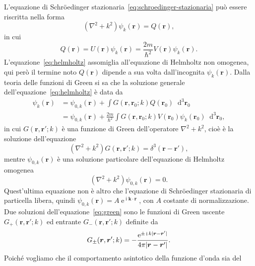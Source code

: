\documentclass[a4paper,fleqn,twoside,12pt]{article}
\newcommand*{\dd}{\mathop{}\!\mathrm{d}} %
\DeclareMathOperator{\e}{\mathrm{e}} %
\DeclareMathOperator{\uimm}{\mathrm{i}} %
\DeclarePairedDelimiter{\abs}{\lvert}{\rvert}
\begin{document}
L'equazione di Schröedinger stazionaria~\eqref{eq:schroedinger-stazionaria} può
essere riscritta nella forma
\begin{equation}
  \label{eq:helmholtz}
  (\nabla^{2} + k^{2})\psi_{k}(\bm{r}) = Q(\bm{r}),
\end{equation}
in cui
\begin{equation}
  Q(\bm{r}) = U(\bm{r})\psi_{k}(\bm{r}) =
  \frac{2m}{\hslash^{2}}V(\bm{r})\psi_{k}(\bm{r}).
\end{equation}
L'equazione~\eqref{eq:helmholtz} assomiglia all'equazione di Helmholtz non
omogenea, qui però il termine noto $Q(\bm{r})$ dipende a sua volta
dall'incognita $\psi_{k}(\bm{r})$.
Dalla teoria delle funzioni di Green si sa che la soluzione generale
dell'equazione~\eqref{eq:helmholtz} è data da
\begin{equation}
  \begin{split}
    \psi_{k}(\bm{r}) &= \psi_{0,k}(\bm{r}) + \int
    G(\bm{r},\bm{r}_{0};k)Q(\bm{r}_{0})\dd^{3}\bm{r}_{0} \\
    &= \psi_{0,k}(\bm{r}) + \frac{2m}{\hslash^{2}}\int
    G(\bm{r},\bm{r}_{0};k)V(\bm{r}_{0})\psi_{k}(\bm{r}_{0})\dd^{3}\bm{r}_{0},
  \end{split}
\end{equation}
in cui $G(\bm{r},\bm{r}';k)$ è una funzione di Green dell'operatore
$\nabla^{2} + k^{2}$, cioè è la soluzione dell'equazione
\begin{equation}
  \label{eq:green}
  (\nabla^{2} + k^{2})G(\bm{r},\bm{r}';k) = \delta^{3}(\bm{r} - \bm{r}'),
\end{equation}
mentre $\psi_{0,k}(\bm{r})$ è una soluzione particolare dell'equazione di
Helmholtz omogenea
\begin{equation}
  (\nabla^{2} + k^{2})\psi_{0,k}(\bm{r}) = 0.
\end{equation}
Quest'ultima equazione non è altro che l'equazione di Schröedinger stazionaria
di particella libera, quindi
$\psi_{0,k}(\bm{r}) = A\e^{\uimm \bm{k}\cdot\bm{r}}$, con $A$ costante di
normalizzazione.  Due soluzioni dell'equazione~\eqref{eq:green} sono le funzioni
di Green uscente $G_{+}(\bm{r},\bm{r}';k)$ ed entrante $G_{-}(\bm{r},\bm{r}';k)$
definite da
\begin{equation}
  G_{\pm}(\bm{r},\bm{r}';k) = -\frac{\e^{\pm \uimm k\abs{\bm{r} -
        \bm{r}'}}}{4\pi \abs{\bm{r} - \bm{r}'}}.
\end{equation}
Poiché vogliamo che il comportamento asintotico della funzione d'onda sia del
\end{document}
